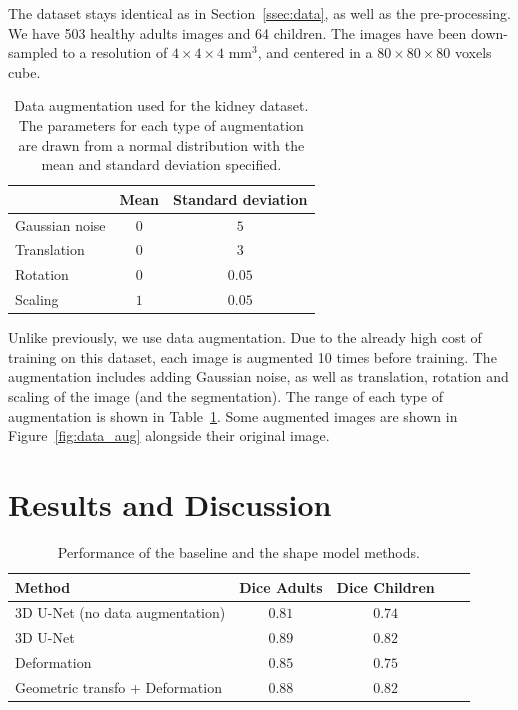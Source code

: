 The dataset stays identical as in Section~\ref{ssec:data}, as well as the pre-processing. We have 503 healthy adults images and 64 children. The images have been down-sampled to a resolution of $4 \times 4 \times 4$ mm$^3$, and centered in a $80 \times 80 \times 80$ voxels cube. 

\begin{table}[htb]
	\centering
	\begin{tabular}{|l|c|c|}
	    \hline
                        & Mean & Standard deviation \\
        \hline
         Gaussian noise & $0$ & $5$ \\
         Translation & $0$ & $3$ \\
         Rotation & $0$ & $0.05$ \\
         Scaling & $1$ & $0.05$ \\
        \hline
    \end{tabular}
	\caption{Data augmentation used for the kidney dataset. The parameters for each type of augmentation are drawn from a normal distribution with the mean and standard deviation specified.}
	\label{table:data_aug}
\end{table}

Unlike previously, we use data augmentation. Due to the already high cost of training on this dataset, each image is augmented 10 times before training. The augmentation includes adding Gaussian noise, as well as translation, rotation and scaling of the image (and the segmentation). The range of each type of augmentation is shown in Table~\ref{table:data_aug}. Some augmented images are shown in Figure~\ref{fig:data_aug} alongside their original image.

\section{Results and Discussion}
\label{sec:seg_result}

\begin{table}[htbp]
	\centering
\begin{tabular}{|l|c|c|c|c|}
	\hline
    Method & Dice Adults & Dice Children \\
	\hline
	3D U-Net (no data augmentation) & $0.81$ & $0.74$ \\
    3D U-Net & $\bm{0.89}$ & $\bm{0.82}$ \\
    Deformation & $0.85$ & $0.75$ \\
    Geometric transfo + Deformation & $0.88$ & $\bm{0.82}$ \\
    \hline
\end{tabular}
	\vspace{2mm}
	\caption{Performance of the baseline and the shape model methods.}
    \label{table:seg_results}
\end{table}

